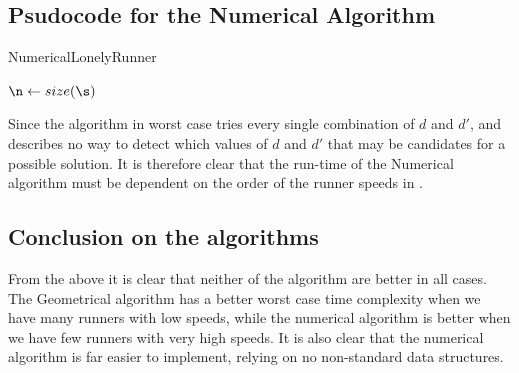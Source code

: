 \subsection{Psudocode for the Numerical Algorithm}
\begin{algorithm}[H]
  \caption{NumericalLonelyRunner}
  \highlights
  
  $\n \gets size(\s)$

  \return \no
\end{algorithm}

Since the algorithm in worst case tries every single combination of
$d$ and $d\prime$, and \cite{invis} describes no way to detect which
values of $d$ and $d\prime$ that may be candidates for a possible
solution. It is therefore clear that the run-time of the Numerical
algorithm must be dependent on the order of the runner speeds in \comS.



\subsection{Conclusion on the algorithms}

From the above it is clear that neither of the algorithm are better in all cases. The Geometrical algorithm has a better worst case time complexity when we have many runners with low speeds, while the numerical algorithm is better when we have few runners with very high speeds. It is also clear that the numerical algorithm is far easier to implement, relying on no non-standard data structures.

